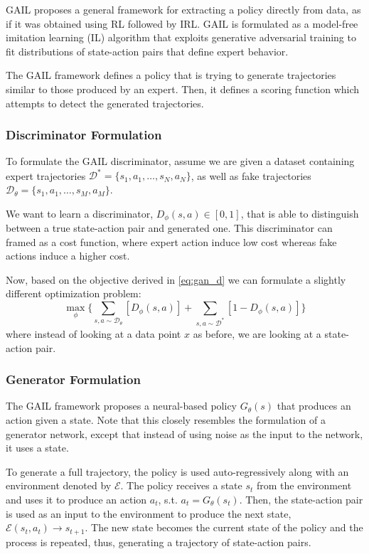 \documentclass[11pt]{article}
\begin{document}
GAIL \cite{ho2016gail} proposes a general framework for extracting a policy directly from data, as if it was obtained using RL followed by IRL. GAIL is formulated as a model-free imitation learning (IL) algorithm that exploits generative adversarial training to fit distributions of state-action pairs that define expert behavior. 

The GAIL framework defines a policy that is trying to generate trajectories similar to those produced by an expert. Then, it defines a scoring function which attempts to detect the generated trajectories. 

\subsubsection{Discriminator Formulation}

To formulate the GAIL discriminator, assume we are given a dataset containing expert trajectories $\mathcal{D}^\ast = \{s_1, a_1, \dots, s_N, a_N\}$, as well as fake trajectories $\mathcal{D}_\theta = \{s_1, a_1, \dots, s_M, a_M\}$. 

We want to learn a discriminator, $D_\phi (s, a) \in [0, 1]$, that is able to distinguish between a true state-action pair and generated one. This discriminator can framed as a cost function, where expert action induce low cost whereas fake actions induce a higher cost. 

Now, based on the objective derived in \eqref{eq:gan_d} we can formulate a slightly different optimization problem:
\begin{equation}
    \label{eq:gail_d}
    \max_{\phi} \Big\{ 
    \sum\limits_{s, a\sim\mathcal{D_\theta}} [D_{\phi}(s, a)] +
    \sum\limits_{s, a\sim\mathcal{D}^\ast} [1 - D_{\phi}(s, a)] \Big\}
\end{equation}
where instead of looking at a data point $x$ as before, we are looking at a state-action pair.  

\subsubsection{Generator Formulation}

The GAIL framework proposes a neural-based policy $G_\theta (s)$ that produces an action given a state. Note that this closely resembles the formulation of a generator network, except that instead of using noise as the input to the network, it uses a state. 

To generate a full trajectory, the policy is used auto-regressively along with an environment denoted by $\mathcal{E}$. The policy receives a state $s_{t}$ from the environment and uses it to produce an action $a_{t}$, s.t. $a_t = G_\theta (s_t)$. Then, the state-action pair is used as an input to the environment to produce the next state, $\mathcal{E}(s_t, a_t) \to s_{t+1}$. The new state becomes the current state of the policy and the process is repeated, thus, generating a trajectory of state-action pairs. 
\end{document}
